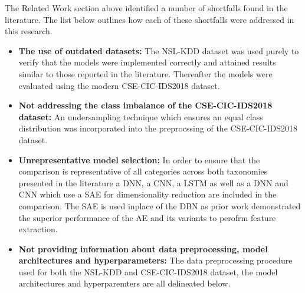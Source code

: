 \documentclass[conference]{IEEEtran}
\begin{document}
The Related Work section above identified a number of shortfalls found in the literature. The list below outlines how each of these shortfalls were addressed in this research. 

\begin{itemize}
    \item \textbf{The use of outdated datasets:} The NSL-KDD dataset was used purely to verify that the models were implemented correctly and attained results similar to those reported in the literature. Thereafter the models were evaluated using the modern CSE-CIC-IDS2018 dataset. 
    \item \textbf{Not addressing the class imbalance of the CSE-CIC-IDS2018 dataset:} An undersampling technique which ensures an equal class distribution was incorporated into the preprocssing of the CSE-CIC-IDS2018 dataset. 
    \item \textbf{Unrepresentative model selection:} In order to ensure that the comparison is representative of all categories across both taxonomies presented in the literature a DNN, a CNN, a LSTM as well as a DNN and CNN which use a SAE for dimensionality reduction are included in the comparison. The SAE is used inplace of the DBN as prior work demonstrated the superior performance of the AE and its variants to perofrm feature extraction. \cite{b10,b13,b14}
    \item \textbf{Not providing information about data preprocessing, model architectures and hyperparameters:} The data preprocessing procedure used for both the NSL-KDD and CSE-CIC-IDS2018 dataset, the model architectures and hyperparemters are all delineated below. 
\end{itemize}


\end{document}
